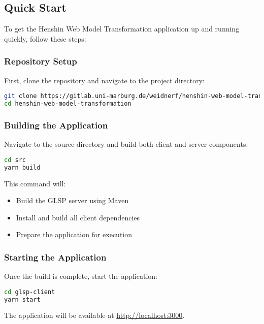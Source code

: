 \subsection{Quick Start}
\label{subsec:quick_start}

To get the Henshin Web Model Transformation application up and running quickly, follow these steps:

\subsubsection{Repository Setup}

First, clone the repository and navigate to the project directory:

\begin{lstlisting}[language=bash]
git clone https://gitlab.uni-marburg.de/weidnerf/henshin-web-model-transformation.git
cd henshin-web-model-transformation
\end{lstlisting}

\subsubsection{Building the Application}

Navigate to the source directory and build both client and server components:

\begin{lstlisting}[language=bash]
cd src
yarn build
\end{lstlisting}

This command will:
\begin{itemize}
    \item Build the GLSP server using Maven
    \item Install and build all client dependencies
    \item Prepare the application for execution
\end{itemize}

\subsubsection{Starting the Application}

Once the build is complete, start the application:

\begin{lstlisting}[language=bash]
cd glsp-client
yarn start
\end{lstlisting}

The application will be available at \url{http://localhost:3000}.

